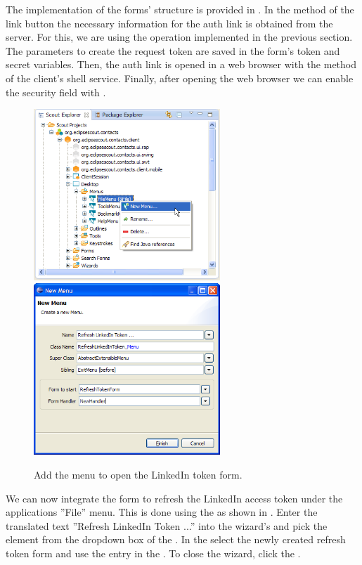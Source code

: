 \documentclass[a4paper,10pt,twoside]{book}
\begin{document}
The implementation of the forms' structure is provided in .
In the  method of the link button  the necessary information for the auth link is obtained from the server. 
For this, we are using the  operation implemented in the previous section. 
The parameters to create the request token are saved in the form's token and secret variables. 
Then, the auth link is opened in a web browser with the   method of the client's shell service. 
Finally, after opening the web browser we can enable the security field with .

\begin{figure}
\includegraphics[width=7cm]{new_menu_refreshtoken_contextmenu.png} \hspace{5mm}
\includegraphics[width=7cm]{new_menu_refreshtoken.png}
\caption{Add the menu to open the LinkedIn token form.}
\end{figure}

We can now integrate the form to refresh the LinkedIn access token under the applications ''File'' menu. 
This is done using the  as shown in . 
Enter the translated text ''Refresh LinkedIn Token ...'' into the wizard's  and pick the element  from the dropdown box of the . 
In the  select the newly created refresh token form and use the  entry in the . 
To close the wizard, click the .
\end{document}
